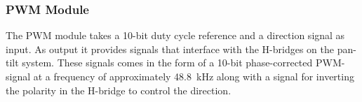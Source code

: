 \documentclass[../../main.tex]{subfiles}
\begin{document}


    


\subsubsection*{PWM Module}
The PWM module takes a 10-bit duty cycle reference and a direction signal as input. As output it provides signals that interface with the H-bridges on the pan-tilt system. These signals comes in the form of a 10-bit phase-corrected PWM-signal at a frequency of approximately \SI{48.8}{\kilo \hertz} along with a signal for inverting the polarity in the H-bridge to control the direction.
\end{document}
